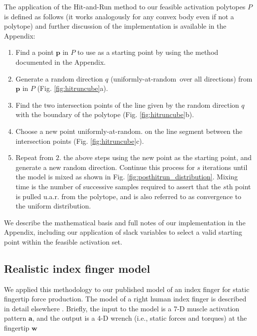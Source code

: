 \documentclass[10pt,letterpaper]{article}
\begin{document}
The application of the Hit-and-Run method to our feasible activation polytopes $P$ is defined as follows (it works analogously for any convex body even if not a polytope)\cite{lovasz1999hit} and further discussion of the implementation is available in the Appendix:

\begin{enumerate}
\item Find a point $\textbf{p}$ in $P$ to use as a starting point by using the method documented in the Appendix.
\item Generate a random direction $q$ (uniformly-at-random\ over all directions) from $\textbf{p}$ in $P$  (Fig. \ref{fig:hitruncube}a).
\item Find the two intersection points of the line given by the random direction $q$ with the boundary of the polytope (Fig. \ref{fig:hitruncube}b).
\item Choose a new point uniformly-at-random. on the line segment between  the intersection points (Fig. \ref{fig:hitruncube}c). 
\item Repeat from $2.$ the above steps using the new point as the starting point, and generate a new random direction. Continue this process for $s$ iterations until the model is mixed as shown in Fig. \ref{fig:posthitrun_distribution}. Mixing time is the number of successive samples required to assert that the $s$th point is pulled u.a.r. from the polytope, and is also referred to as convergence to the uniform distribution.
\end{enumerate}



We describe the mathematical basis and full notes of our implementation in the Appendix, including our application of slack variables to select a valid starting point within the feasible activation set.

\subsection*{Realistic index finger model}
\label{ss:finger}
We  applied this methodology to our published model of an index finger for static fingertip force production. 
The model of a right human index finger is described in detail elsewhere \cite{Valero-Cuevas1998Large,Valero-Cuevas2000Scaling,valero-cuevas2009computational}. Briefly,  the input to the model is a 7-D muscle activation pattern $\textbf{a}$, and the output is a 4-D  wrench (i.e., static forces and torques) at the fingertip  $\textbf{w}$
\end{document}
